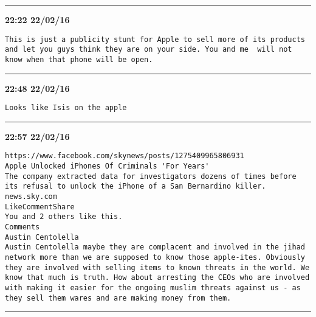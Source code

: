 \hrule%

\begin{adjustwidth}{0cm}{0cm}
\footnotesize \textbf{22:22 22/02/16}

\begin{lstlisting}[breaklines, breakatwhitespace, basicstyle=\small, frame=leftline]
This is just a publicity stunt for Apple to sell more of its products and let you guys think they are on your side. You and me  will not know when that phone will be open.
\end{lstlisting}
\end{adjustwidth}

\hrule%

\begin{adjustwidth}{0cm}{0cm}
\footnotesize \textbf{22:48 22/02/16}

\begin{lstlisting}[breaklines, breakatwhitespace, basicstyle=\small, frame=leftline]
Looks like Isis on the apple
\end{lstlisting}
\end{adjustwidth}

\hrule%

\begin{adjustwidth}{0cm}{0cm}
\footnotesize \textbf{22:57 22/02/16}

\begin{lstlisting}[breaklines, breakatwhitespace, basicstyle=\small, frame=leftline]
https://www.facebook.com/skynews/posts/1275409965806931
Apple Unlocked iPhones Of Criminals 'For Years'
The company extracted data for investigators dozens of times before its refusal to unlock the iPhone of a San Bernardino killer.
news.sky.com
LikeCommentShare
You and 2 others like this.
Comments
Austin Centolella
Austin Centolella maybe they are complacent and involved in the jihad network more than we are supposed to know those apple-ites. Obviously they are involved with selling items to known threats in the world. We know that much is truth. How about arresting the CEOs who are involved with making it easier for the ongoing muslim threats against us - as they sell them wares and are making money from them.
\end{lstlisting}
\end{adjustwidth}

\hrule%

